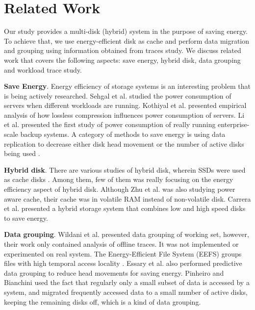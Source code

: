 \section{Related Work} 
\label{sec:related} 

Our study provides a multi-disk (hybrid) system in the purpose of
saving energy. To achieve that, we use energy-efficient disk as cache
and perform data migration and grouping using information obtained
from traces study. We discuss related work that covers the following
aspects: save energy, hybrid disk, data grouping and workload trace
study.

\textbf{Save Energy}. Energy efficiency of storage systems is an
interesting problem that is being actively researched. Sehgal et al.
\cite{fast10fsgreen} studied the power consumption of servers when
different workloads are running. Kothiyal et al.
\cite{systor09greencomp} presented empirical analysis of how lossless
compression influences power consumption of servers. Li et al.
\cite{fast12emc-energy} presented the first study of power consumption
of really running enterprise-scale backup systems. A category of
methods to save energy is using data replication to decrease either
disk head movement \cite{huangfs2, pred_data_grouping} or the number
of active disks being used \cite{Weddle07paraid}. 

\textbf{Hybrid disk}. There are various studies of hybrid disk,
wherein SSDs were used as cache disks \cite{Bisson07ahybrid,
Debnath_SkimpyStash, Debnath_Bloomflash, flashcache_experiments}.
Among them, few of them was really focusing on the energy efficiency
aspect of hybrid disk\cite{Bisson07ahybrid}. Although Zhu et al.
\cite{Zhu04reducingenergy} was also studying power aware cache, their
cache was in volatile RAM instead of non-volatile disk. Carrera et al.
\cite{slow_fast} presented a hybrid storage system that combines low
and high speed disks to save energy.

\textbf{Data grouping}. Wildani et al. \cite{Wildani_grouping}
presented data grouping of working set, however, their work only
contained analysis of offline traces. It was not implemented or
experimented on real system. The Energy-Efficient File System (EEFS)
groups files with high temporal access locality
\cite{Li06highperformance}. Essary et al. \cite{pred_data_grouping}
also performed predictive data grouping to reduce head movements for
saving energy.  Pinheiro and Bianchini \cite{migration04} used the
fact that regularly only a small subset of data is accessed by a
system, and migrated frequently accessed data to a small number of
active disks, keeping the remaining disks off, which is a kind of data
grouping.


